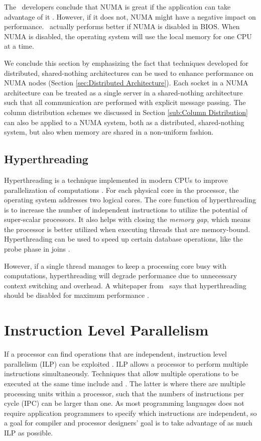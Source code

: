 The \qlikview~developers conclude that NUMA is great if the application can take advantage of it \cite{Qlik2013-an}. However, if it does not, NUMA might have a negative impact on performance. \qlikview~actually performs better if NUMA is disabled in BIOS. When NUMA is disabled, the operating system will use the local memory for one CPU at a time.

We conclude this section by emphasizing the fact that techniques developed for distributed, shared-nothing architectures can be used to enhance performance on NUMA nodes \cite{Mukherjee2015-ul} (Section \ref{sec:Distributed Architecture}). Each socket in a NUMA architecture can be treated as a single server in a shared-nothing architecture such that all communication are performed with explicit message passing. The column distribution schemes we discussed in Section \ref{sub:Column Distribution} can also be applied to a NUMA system, both as a distributed, shared-nothing system, but also when memory are shared in a non-uniform fashion.  

\subsection{Hyperthreading}
\label{sub:Hyperthreading}
Hyperthreading is a technique implemented in modern CPUs to improve parallelization of computations \cite{Wikipedia_contributors2015-yx}. For each physical core in the processor, the operating system addresses two logical cores. The core function of hyperthreading is to increase the number of independent instructions to utilize the potential of super-scalar processors. It also helps with closing the \textit{memory gap}, which means the processor is better utilized when executing threads that are memory-bound. Hyperthreading can be used to speed up certain database operations, like the probe phase in joins \cite{Barber2014-ey}.

However, if a single thread manages to keep a processing core busy with computations, hyperthreading will degrade performance due to unnecessary context switching and overhead. A whitepaper from \qlikview~says that hyperthreading should be disabled for maximum performance \cite{Qlik2011-yc}.

\section{Instruction Level Parallelism}
\label{sec:Instruction Level Parallelism}
If a processor can find operations that are independent, instruction level parallelism (ILP) can be exploited \cite{Wikipedia_contributors2015-vg}. ILP allows a processor to perform multiple instructions simultaneously. Techniques that allow multiple operations to be executed at the same time include  and . The latter is where there are multiple processing units within a processor, such that the numbers of instructions per cycle (IPC) can be larger than one. As most programming languages does not require application programmers to specify which instructions are independent, so a goal for compiler and processor designers' goal is to take advantage of as much ILP as possible.

